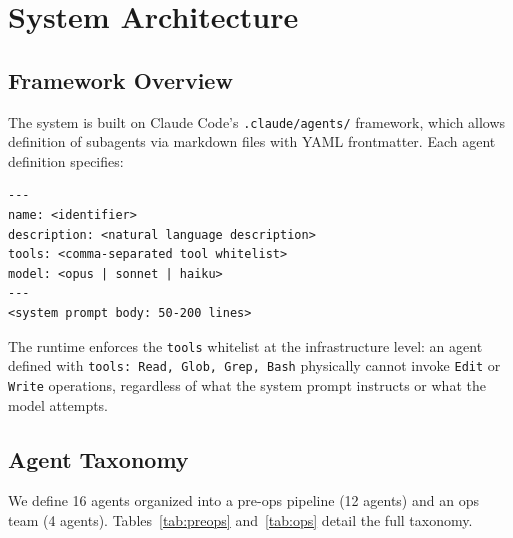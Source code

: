 \documentclass[a4paper,USenglish,cleveref,autoref]{lipics-v2021}
\begin{document}
\section{System Architecture}
\label{sec:architecture}

\subsection{Framework Overview}

The system is built on Claude Code's \texttt{.claude/agents/} framework, which allows definition of subagents via markdown files with YAML frontmatter. Each agent definition specifies:

\begin{lstlisting}[caption={Agent definition schema.}]
---
name: <identifier>
description: <natural language description>
tools: <comma-separated tool whitelist>
model: <opus | sonnet | haiku>
---
<system prompt body: 50-200 lines>
\end{lstlisting}

The runtime enforces the \texttt{tools} whitelist at the infrastructure level: an agent defined with \texttt{tools: Read, Glob, Grep, Bash} physically cannot invoke \texttt{Edit} or \texttt{Write} operations, regardless of what the system prompt instructs or what the model attempts.

\subsection{Agent Taxonomy}
\label{sec:taxonomy}

We define 16 agents organized into a pre-ops pipeline (12 agents) and an ops team (4 agents). Tables~\ref{tab:preops} and~\ref{tab:ops} detail the full taxonomy.
\end{document}
